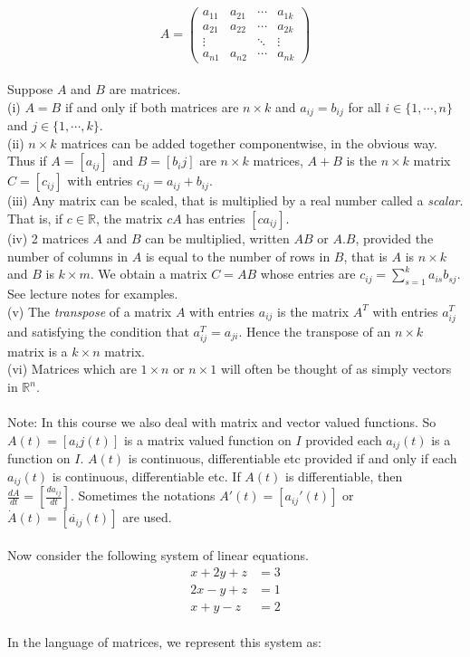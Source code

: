 \documentclass{amsart}
\begin{document}
\begin{equation*}
A
 =
 \begin{pmatrix}
 a_{11}&a_{21}&\cdots& a_{1k}\\
 a_{21}&a_{22}&\cdots& a_{2k}\\
 \vdots&&\ddots&\vdots\\
 a_{n1}&a_{n2}&\cdots& a_{nk}
 \end{pmatrix}
 \end{equation*}
\\
Suppose $A$ and $B$ are matrices.\\ 
(i) $A=B$ if and only if both matrices are $n\times k$ and $a_{ij}=b_{ij}$ for all $i\in\{1,\cdots,n\}$ and $j\in\{1,\cdots,k\}$.\\ 
(ii) $n\times k$ matrices can be added together componentwise, in the obvious way. Thus if $A=[a_{ij}]$ and $B=[b_ij]$ are $n\times k$ matrices, $A+B$ is the $n\times k$ matrix $C=[c_{ij}]$ with entries $c_{ij}=a_{ij}+b_{ij}$.\\
(iii) Any matrix can be scaled, that is multiplied by a real number called a {\it scalar}. That is, if $c\in\mathbb{R}$, the matrix $cA$ has entries $[ca_{ij}]$.\\
(iv) 2 matrices $A$ and $B$ can be multiplied, written $AB$ or $A.B$, provided the number of columns in $A$ is equal to the number of rows in $B$, that is $A$ is $n\times k$ and $B$ is $k\times m$. We obtain a matrix $C=AB$ whose entries are $c_{ij}=\sum_{s=1}^{k}a_{is}b_{sj}$. See lecture notes for examples.\\
(v) The {\it transpose} of a matrix $A$ with entries $a_{ij}$ is the matrix $A^{T}$ with entries $a_{ij}^{T}$ and satisfying the condition that $a_{ij}^{T}=a_{ji}$. Hence the transpose of an $n\times k$ matrix is a $k\times n$ matrix.\\
(vi) Matrices which are $1\times n$ or $n\times 1$ will often be thought of as simply vectors in $\mathbb{R}^{n}$.\\
\\
Note: In this course we also deal with matrix and vector valued functions. So $A(t)=[a_ij(t)]$ is a matrix valued function on $I$ provided each $a_{ij}(t)$ is a function on $I$. $A(t)$ is continuous, differentiable etc provided if and only if each $a_{ij}(t)$ is continuous, differentiable etc. If $A(t)$ is differentiable, then $\frac{dA}{dt}=[\frac{da_{ij}}{dt}]$. Sometimes the notations $A'(t)=[a_{ij}'(t)]$ or $\dot{A}(t)=[\dot{a_{ij}}(t)]$ are used.\\
\\ 
Now consider the following system of linear equations.\\
\begin{equation*}
\begin{split}
x+2y+z&=3\\
2x-y+z&=1\\
x+y-z&=2
\end{split}
\end{equation*}
\\
In the language of matrices, we represent this system as:\\
\\
\end{document}
